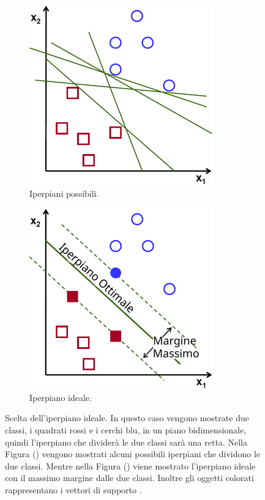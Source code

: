 \documentclass[a4paper,12pt]{report}
\begin{document}
\begin{figure}[ht]
    \begin{subfigure}{0.47\textwidth}
        \centering
        \includegraphics[scale=0.5]{images/iperpiani_svm.png}
        \caption{Iperpiani possibili.}
        \label{fig:iperpiani_svm}
    \end{subfigure}
    \begin{subfigure}{0.47\textwidth}
        \centering
        \includegraphics[scale=0.5]{images/iperpiano_ottimale_svm_ita.png}
        \caption{Iperpiano ideale.}
        \label{fig:iperpiano_ideale}
    \end{subfigure}
    \caption{Scelta dell'iperpiano ideale. In questo caso vengono mostrate due classi, i quadrati rossi e i cerchi blu, in un piano bidimensionale, quindi l'iperpiano che dividerà le due classi sarà una retta. Nella Figura (\protect{}) vengono mostrati alcuni possibili iperpiani che dividono le due classi. Mentre nella Figura (\protect{}) viene mostrato l'iperpiano ideale con il massimo margine dalle due classi. Inoltre gli oggetti colorati rappresentano i vettori di supporto \cite{SVM}. }
    \label{fig:svm}
\end{figure}
\end{document}
